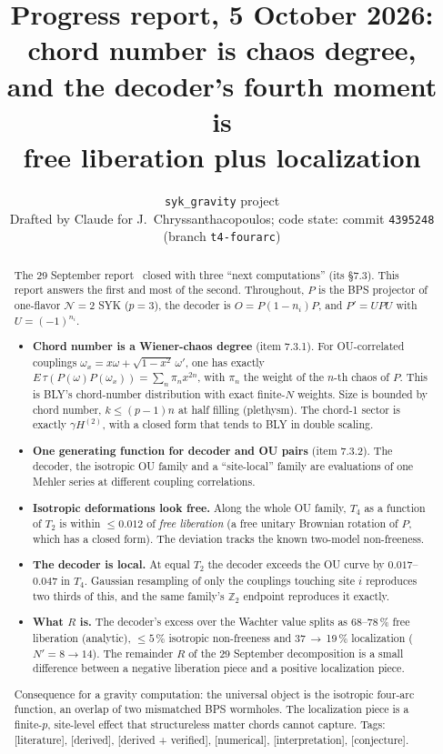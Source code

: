 \documentclass[11pt]{article}
\title{\bf Progress report, 5 October 2026:\\ chord number is chaos degree,\\ and the decoder's fourth moment
is\\ free liberation plus localization}
\author{\texttt{syk\_gravity} project\\[2pt]\small Drafted by Claude for J.~Chryssanthacopoulos; code state: commit
\texttt{4395248} (branch \texttt{t4-fourarc})}
\date{}
\newcommand{\Np}{N'}
\newcommand{\tagbox}[2]{\textsf{\small\color{#1}[#2]}}
\newcommand{\EST}{\tagbox{cest}{literature}}
\newcommand{\DER}{\tagbox{cder}{derived}}
\newcommand{\VER}{\tagbox{cder}{derived + verified}}
\newcommand{\NUM}{\tagbox{cnum}{numerical}}
\newcommand{\CONJ}{\tagbox{cconj}{conjecture}}
\newcommand{\INTERP}{\tagbox{cconj}{interpretation}}
\theoremstyle{remark}
\begin{document}
\maketitle

\begin{abstract}
\noindent
The 29 September report~\cite{prog0929} closed with three ``next computations'' (its \S7.3). This report answers the
first and most of the second. Throughout, $P$ is the BPS projector of one-flavor $\mathcal N{=}2$ SYK ($p=3$), the decoder is
$O=P(1-n_i)P$, and $P'=UPU$ with $U=(-1)^{n_i}$.
\begin{itemize}\itemsep1pt
\item \textbf{Chord number is a Wiener-chaos degree} (item 7.3.1). For OU-correlated couplings
  $\omega_x=x\omega+\sqrt{1-x^2}\,\omega'$, one has exactly $E\,\tau(P(\omega)P(\omega_x))=\sum_n\pi_nx^{2n}$, with $\pi_n$
  the weight of the $n$-th chaos of $P$. This is BLY's chord-number distribution with exact finite-$N$ weights. Size is
  bounded by chord number, $k\le(p-1)n$ at half filling (plethysm). The chord-1 sector is exactly $\gamma H^{(2)}$, with
  a closed form that tends to BLY in double scaling.
\item \textbf{One generating function for decoder and OU pairs} (item 7.3.2). The decoder, the isotropic OU family and a
  ``site-local'' family are evaluations of one Mehler series at different coupling correlations.
\item \textbf{Isotropic deformations look free.} Along the whole OU family, $T_4$ as a function of $T_2$ is within
  $\le0.012$ of \emph{free liberation} (a free unitary Brownian rotation of $P$, which has a closed form). The deviation
  tracks the known two-model non-freeness.
\item \textbf{The decoder is local.} At equal $T_2$ the decoder exceeds the OU curve by $0.017$--$0.047$ in $T_4$.
  Gaussian resampling of only the couplings touching site $i$ reproduces two thirds of this, and the same family's
  $\mathbb Z_2$ endpoint reproduces it exactly.
\item \textbf{What $R$ is.} The decoder's excess over the Wachter value splits as 68--78\,\% free liberation (analytic),
  $\le5\,\%$ isotropic non-freeness and 37\,$\to$\,19\,\% localization ($\Np=8\to14$). The remainder $R$ of the 29 September
  decomposition is a small difference between a negative liberation piece and a positive localization piece.
\end{itemize}
Consequence for a gravity computation: the universal object is the isotropic four-arc function, an overlap of two
mismatched BPS wormholes. The localization piece is a finite-$p$, site-level effect that structureless matter chords
cannot capture. Tags: \EST, \DER, \VER, \NUM, \INTERP, \CONJ.
\end{abstract}
\end{document}
